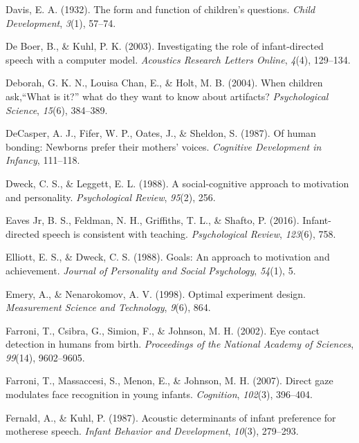 \documentclass[english,floatsintext,man]{apa6}
\theoremstyle{definition}
\theoremstyle{definition}
\theoremstyle{definition}
\theoremstyle{remark}
\begin{document}
\hypertarget{ref-davis1932form}{}
Davis, E. A. (1932). The form and function of children's questions.
\emph{Child Development}, \emph{3}(1), 57--74.

\hypertarget{ref-de2003investigating}{}
De Boer, B., \& Kuhl, P. K. (2003). Investigating the role of
infant-directed speech with a computer model. \emph{Acoustics Research
Letters Online}, \emph{4}(4), 129--134.

\hypertarget{ref-deborah2004children}{}
Deborah, G. K. N., Louisa Chan, E., \& Holt, M. B. (2004). When children
ask,``What is it?'' what do they want to know about artifacts?
\emph{Psychological Science}, \emph{15}(6), 384--389.

\hypertarget{ref-decasper1987human}{}
DeCasper, A. J., Fifer, W. P., Oates, J., \& Sheldon, S. (1987). Of
human bonding: Newborns prefer their mothers' voices. \emph{Cognitive
Development in Infancy}, 111--118.

\hypertarget{ref-dweck1988social}{}
Dweck, C. S., \& Leggett, E. L. (1988). A social-cognitive approach to
motivation and personality. \emph{Psychological Review}, \emph{95}(2),
256.

\hypertarget{ref-eaves2016infant}{}
Eaves Jr, B. S., Feldman, N. H., Griffiths, T. L., \& Shafto, P. (2016).
Infant-directed speech is consistent with teaching. \emph{Psychological
Review}, \emph{123}(6), 758.

\hypertarget{ref-elliott1988goals}{}
Elliott, E. S., \& Dweck, C. S. (1988). Goals: An approach to motivation
and achievement. \emph{Journal of Personality and Social Psychology},
\emph{54}(1), 5.

\hypertarget{ref-emery1998optimal}{}
Emery, A., \& Nenarokomov, A. V. (1998). Optimal experiment design.
\emph{Measurement Science and Technology}, \emph{9}(6), 864.

\hypertarget{ref-farroni2002eye}{}
Farroni, T., Csibra, G., Simion, F., \& Johnson, M. H. (2002). Eye
contact detection in humans from birth. \emph{Proceedings of the
National Academy of Sciences}, \emph{99}(14), 9602--9605.

\hypertarget{ref-farroni2007direct}{}
Farroni, T., Massaccesi, S., Menon, E., \& Johnson, M. H. (2007). Direct
gaze modulates face recognition in young infants. \emph{Cognition},
\emph{102}(3), 396--404.

\hypertarget{ref-fernald1987acoustic}{}
Fernald, A., \& Kuhl, P. (1987). Acoustic determinants of infant
preference for motherese speech. \emph{Infant Behavior and Development},
\emph{10}(3), 279--293.
\end{document}
